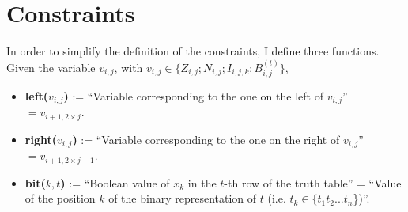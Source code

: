 \documentclass[letterpaper,10pt]{article}
\begin{document}
\section{Constraints}
In order to simplify the definition of the constraints, I define three functions. Given the variable $v_{i,j}$, with $v_{i,j} \in \{Z_{i,j}; N_{i,j}; I_{i,j,k}; B_{i,j}^{(t)}\}$,
\begin{itemize}
    \item \textbf{left($v_{i,j}$)} := ``Variable corresponding to the one on the left of $v_{i,j}$'' $ = v_{i+1,2\times j}$.
    \item \textbf{right($v_{i,j}$)} := ``Variable corresponding to the one on the right of $v_{i,j}$'' $ = v_{i+1,2\times j+1}$.
    \item \textbf{bit($k,t$)} := ``Boolean value of $x_k$ in the $t$-th row of the truth table'' = ``Value of the position $k$ of the binary representation of $t$ (i.e. $t_k \in \{t_1 t_2 ... t_n$\})''.
\end{itemize}
\end{document}
